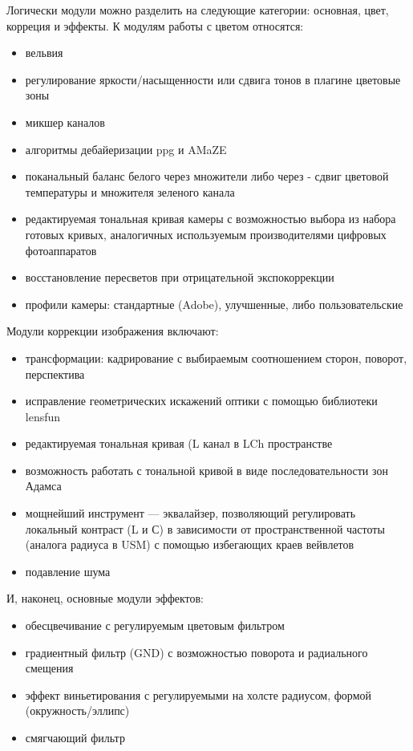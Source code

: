\documentclass[10pt, a5paper]{article}
\begin{document}
Логически модули можно разделить на следующие категории: основная, цвет, корреция и эффекты.
К модулям работы с цветом относятся:
\begin{itemize}
\item вельвия
\item регулирование яркости/насыщенности или сдвига тонов в плагине цветовые зоны
\item микшер каналов
\item алгоритмы дебайеризации ppg и AMaZE 
\item поканальный баланс белого через множители либо через  - сдвиг цветовой температуры и множителя зеленого канала
\item редактируемая тональная кривая камеры с возможностью выбора из набора готовых кривых, аналогичных используемым производителями цифровых фотоаппаратов
\item восстановление пересветов при отрицательной экспокоррекции
\item профили камеры: стандартные (Adobe), улучшенные, либо пользовательские
\end{itemize}
Модули коррекции изображения включают:
\begin{itemize}
\item трансформации: кадрирование с выбираемым соотношением сторон, поворот, перспектива
\item исправление геометрических искажений оптики с помощью библиотеки lensfun
\item редактируемая тональная кривая (L канал в LCh пространстве
\item возможность работать с тональной кривой в виде последовательности зон Адамса
\item мощнейший инструмент --- эквалайзер, позволяющий регулировать локальный контраст (L и С) в зависимости от пространственной частоты (аналога радиуса в USM) с помощью избегающих краев вейвлетов
\item подавление шума
\end{itemize}
И, наконец, основные модули эффектов:
\begin{itemize}
\item обесцвечивание с регулируемым цветовым фильтром
\item градиентный фильтр (GND) с возможностью поворота и радиального смещения
\item эффект виньетирования с регулируемыми на холсте радиусом, формой (окружность/эллипс)
\item смягчающий фильтр
\end{itemize}
\end{document}

